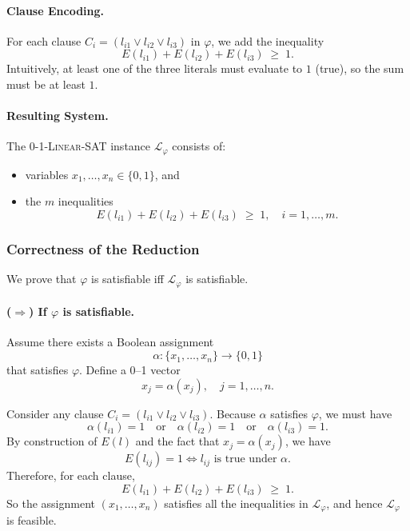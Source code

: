 \documentclass[9pt]{extarticle}
\begin{document}
\paragraph{Clause Encoding.}
For each clause $C_i = (l_{i1} \lor l_{i2} \lor l_{i3})$ in $\varphi$, we add
the inequality
\[
E(l_{i1}) + E(l_{i2}) + E(l_{i3}) \;\ge\; 1.
\]
Intuitively, at least one of the three literals must evaluate to $1$ (true), so
the sum must be at least $1$.

\paragraph{Resulting System.}
The \textsc{0-1-Linear-SAT} instance $\mathcal{L}_\varphi$ consists of:
\begin{itemize}
    \item variables $x_1,\dots,x_n \in \{0,1\}$, and
    \item the $m$ inequalities
    \[
        E(l_{i1}) + E(l_{i2}) + E(l_{i3}) \;\ge\; 1, \quad i = 1,\dots,m.
    \]
\end{itemize}

\subsubsection*{Correctness of the Reduction}

We prove that $\varphi$ is satisfiable iff $\mathcal{L}_\varphi$ is satisfiable.

\paragraph{($\Rightarrow$) If $\varphi$ is satisfiable.}

Assume there exists a Boolean assignment
\[
\alpha : \{x_1,\dots,x_n\} \to \{0,1\}
\]
that satisfies $\varphi$.  Define a 0–1 vector
\[
x_j = \alpha(x_j), \quad j = 1,\dots,n.
\]

Consider any clause $C_i = (l_{i1} \lor l_{i2} \lor l_{i3})$.  
Because $\alpha$ satisfies $\varphi$, we must have
\[
\alpha(l_{i1}) = 1 \quad \text{or} \quad
\alpha(l_{i2}) = 1 \quad \text{or} \quad
\alpha(l_{i3}) = 1.
\]
By construction of $E(l)$ and the fact that $x_j = \alpha(x_j)$, we have
\[
E(l_{ij}) = 1 \iff l_{ij} \text{ is true under } \alpha.
\]
Therefore, for each clause,
\[
E(l_{i1}) + E(l_{i2}) + E(l_{i3}) \;\ge\; 1.
\]
So the assignment $(x_1,\dots,x_n)$ satisfies all the inequalities in
$\mathcal{L}_\varphi$, and hence $\mathcal{L}_\varphi$ is feasible.
\end{document}

